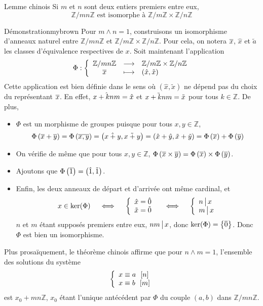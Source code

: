     \begin{lem}{Lemme chinois}{}
        Si $m$ et $n$ sont deux entiers premiers entre eux, 
        \[ \mathbb{Z} / mn \mathbb{Z} \text{ est isomorphe à } \mathbb{Z} / m \mathbb{Z} \times \mathbb{Z} / n \mathbb{Z} \]
    \end{lem}

    \begin{demo}{Démonstration}{mybrown}
        Pour $m \wedge n = 1$, construisons un isomorphisme d’anneaux naturel entre $\mathbb{Z}/ mn \mathbb{Z}$ et $\mathbb{Z} / m \mathbb{Z} \times \mathbb{Z} / n \mathbb{Z}$. Pour cela, on notera $\overline{x}$, $\hat{x}$ et $\tilde{a}$ les classes d’équivalence respectives de $x$. Soit maintenant l’application 
        \[ \fonction{\Phi}{\mathbb{Z}/ mn \mathbb{Z}}{\mathbb{Z} / m \mathbb{Z} \times \mathbb{Z} / n \mathbb{Z}}{\ovl{x}}{(\hat{x}, \tilde{x})}  \]   
        Cette application est bien définie dans le sens où $(\hat{x}, \tilde{x})$ ne dépend pas du choix du représentant $\overline{x}$. En effet, $\Hat{x + knm} = \hat{x}$ et $\Tilde{x + knm} = \tilde{x}$ pour tous $k \in \mathbb{Z}$. De plus, 
        \begin{itemize}
            \item $\Phi$ est un morphisme de groupes puisque pour tous $x,y \in \mathbb{Z}$,
            \[ \Phi\left(\overline{x} + \overline{y}\right) = \Phi\left(\overline{x,y}\right) = \left(\Hat{x + y}, \Tilde{x+ y}\right) = \left(\hat{x} + \hat{y}, \tilde{x} + \tilde{y}\right) = \Phi\left(\overline{x}\right) + \Phi\left(\overline{y}\right) \]   
            \item On vérifie de même que pour tous $x,y \in \mathbb{Z}$, $\Phi\left(\overline{x} \times \overline{y}\right) = \Phi\left(\overline{x}\right) \times \Phi\left(\overline{y}\right)$.
            \item Ajoutons que $\Phi\left(\overline{1}\right) = \left(\hat{1}, \tilde{1}\right)$.
            \item Enfin, les deux anneaux de départ et d’arrivée ont même cardinal, et 
            \[ x \in \ker(\Phi) \quad \iff \quad \et{\hat{x} = \hat{0}}{\tilde{x} = \tilde{0}} \quad \iff \quad \et{n \vbar x}{m \vbar x} \]   
            $n$ et $m$ étant supposés premiers entre eux, $nm \, \big| \, x$, donc $\ker(\Phi) = \left\{\overline{0}\right\}$. Donc $\Phi$ est bien un isomorphisme.
        \end{itemize}
    \end{demo}

    Plus prosaïquement, le théorème chinois affirme que pour $n \wedge m = 1$, l’ensemble des solutions du système 
    \[ \et{\eqmodulo{x}{a}{n}}{\eqmodulo{x}{b}{m}} \]   
    est $x_0 + mn \mathbb{Z}$, $x_0$ étant l’unique antécédent par $\Phi$ du couple $(a,b)$ dans $\mathbb{Z} / m n \mathbb{Z}$. 

